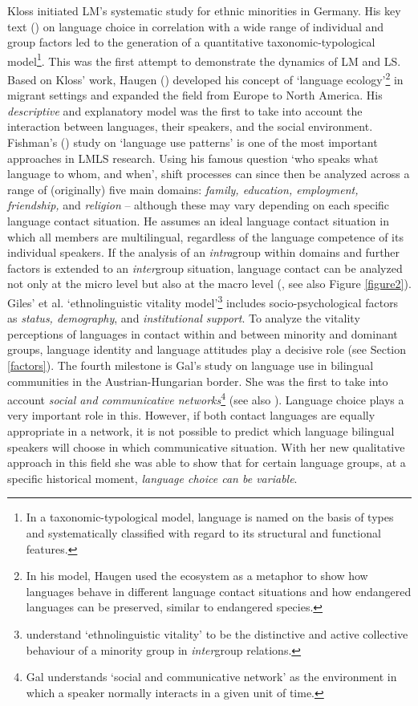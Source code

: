 \documentclass[output=paper,
modfonts
]{langscibook}
\begin{document}
Kloss initiated LM's systematic study for ethnic minorities in Germany. His key text (\citeyear{Kloss1966}) on language choice in correlation with a wide range of individual and group factors led to the generation of a quantitative taxonomic-typological model\footnote{In a taxonomic-typological model, language is named on the basis of types and systematically classified with regard to its structural and functional features.}. This was the first attempt to demonstrate the dynamics of LM and LS.
Based on Kloss' work, Haugen  (\citeyear{Haugen1972}) developed his concept of ‘language ecology'\footnote{In his model, Haugen used the ecosystem as a metaphor to show how languages behave in different language contact situations and how endangered languages can be preserved, similar to endangered species.} in migrant settings and expanded the field from Europe to North America. His \textit{descriptive} and explanatory model was the first to take into account the interaction between languages, their speakers, and the social environment.
Fishman's (\citeyear{Fishman1972}) study on ‘language use patterns' is one of the most important approaches in LMLS research. Using his famous question ‘who speaks what language to whom, and when', shift processes can since then be analyzed across a range of (originally) five main domains: \emph{family, education, employment, friendship,} and \emph{religion} -- although these may vary depending on each specific language contact situation. He assumes an ideal language contact situation in which all members are multilingual, regardless of the language competence of its individual speakers. If the analysis of an \emph{intra}group within domains and further factors is extended to an \emph{inter}group situation, language contact can be analyzed not only at the micro level but also at the macro level (\cite[335-336]{Werlen2004}, see also Figure \ref{figure2}).
Giles' et al. \parencite*{Giles1977} ‘ethnolinguistic vitality model'\footnote{ \cite[308]{Giles1977} understand ‘ethnolinguistic vitality' to be the distinctive and active collective behaviour of a minority group in \emph{inter}group relations.} includes socio-psychological factors as \emph{status, demography}, and \emph{institutional support}. To analyze the vitality perceptions of languages in contact within and between minority and dominant groups, language identity and language attitudes play a decisive role (see Section \ref{factors}).
The fourth milestone is Gal's \parencite*{Gal1979} study on language use in bilingual communities in the Austrian-Hungarian border. She was the first to take into account \textit{social and communicative networks}\footnote{Gal \parencite*{Gal1979} understands ‘social and communicative network' as the environment in which a speaker normally interacts in a given unit of time.} (see also \citealt{Dorian1980}). Language choice plays a very important role in this. However, if both contact languages are equally appropriate in a network, it is not possible to predict which language bilingual speakers will choose in which communicative situation. With her new qualitative approach in this field she was able to show that for certain language groups, at a specific historical moment, \emph{language choice can be variable}. 
\end{document}

